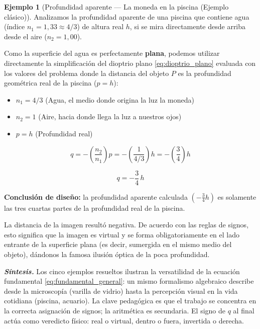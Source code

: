 \documentclass[12pt, a4paper]{article}
\theoremstyle{definition}
\newtheorem{ejemplo}{Ejemplo}[section]
\begin{document}
\begin{ejemplo}[Profundidad aparente --- La moneda en la piscina (Ejemplo clásico)]
Analizamos la profundidad aparente de una piscina que contiene agua (índice
\(n_1 = 1{,}33 \approx 4/3\)) de altura real \(h\), si se mira directamente desde arriba
desde el aire (\(n_2 = 1{,}00\)).

Como la superficie del agua es perfectamente \textbf{plana}, podemos utilizar directamente
la simplificación del dioptrio plano \eqref{eq:dioptrio_plano} evaluada con los valores
del problema donde la distancia del objeto \(P\) es la profundidad geométrica real de la
piscina (\(p = h\)):

\begin{itemize}
  \item \(n_1 = 4/3\) (Agua, el medio donde origina la luz la moneda)
  \item \(n_2 = 1\) (Aire, hacia donde llega la luz a nuestros ojos)
  \item \(p = h\) (Profundidad real)
\end{itemize}

\[
  q = -\left(\frac{n_2}{n_1}\right)p = -\left(\frac{1}{4/3}\right)h = -\left(\frac{3}{4}\right)h
\]

\begin{equation}
  \boxed{q = -\frac{3}{4}\,h}
  \label{eq:profundidad_aparente}
\end{equation}

\textbf{Conclusión de diseño:} la profundidad aparente calculada \(\left(-\frac{3}{4}h\right)\)
es solamente las tres cuartas partes de la profundidad real de la piscina.

La distancia de la imagen resultó negativa. De acuerdo con las reglas de signos, esto
significa que la imagen es virtual y se forma obligatoriamente en el lado entrante de la
superficie plana (es decir, sumergida en el mismo medio del objeto), dándonos la famosa
ilusión óptica de la poca profundidad.
\end{ejemplo}

\textit{\textbf{Síntesis.}} Los cinco ejemplos resueltos ilustran la versatilidad de la
ecuación fundamental \eqref{eq:fundamental_general}: un mismo formalismo algebraico
describe desde la microscopía (varilla de vidrio) hasta la percepción visual en la vida
cotidiana (piscina, acuario). La clave pedagógica es que el trabajo se concentra en la
correcta asignación de signos; la aritmética es secundaria. El signo de \(q\) al final
actúa como veredicto físico: real o virtual, dentro o fuera, invertida o derecha.
\end{document}
